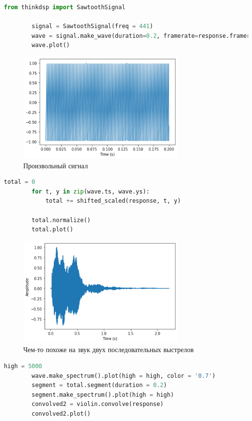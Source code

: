 \documentclass[a4paper, 12pt]{report}
\begin{document}
	\begin{lstlisting}[language=Python,caption=Произвольный входной сигнал]
		from thinkdsp import SawtoothSignal

		signal = SawtoothSignal(freq = 441)
		wave = signal.make_wave(duration=0.2, framerate=response.framerate)
		wave.plot()
	\end{lstlisting}
	\begin{figure}[H]
		\centering
		\includegraphics[width=0.75\textwidth]{shot11.png}
		\caption{Произвольный сигнал}
		\label{fig:shot11}
	\end{figure}
	\begin{lstlisting}[language=Python,caption=Генерация сдвинутых версий импульсной характеристики]
		total = 0
		for t, y in zip(wave.ts, wave.ys):
			total += shifted_scaled(response, t, y)
		
		total.normalize()
		total.plot()
	\end{lstlisting}
	\begin{figure}[H]
		\centering
		\includegraphics[width=0.75\textwidth]{shot12.png}
		\caption{Чем-то похоже на звук двух последовательных выстрелов}
		\label{fig:shot12}
	\end{figure}
	\begin{lstlisting}[language=Python,caption=Используем метод свертки]
		high = 5000
		wave.make_spectrum().plot(high = high, color = '0.7')
		segment = total.segment(duration = 0.2)
		segment.make_spectrum().plot(high = high)
		convolved2 = violin.convolve(response)
		convolved2.plot()
	\end{lstlisting}
\end{document}
